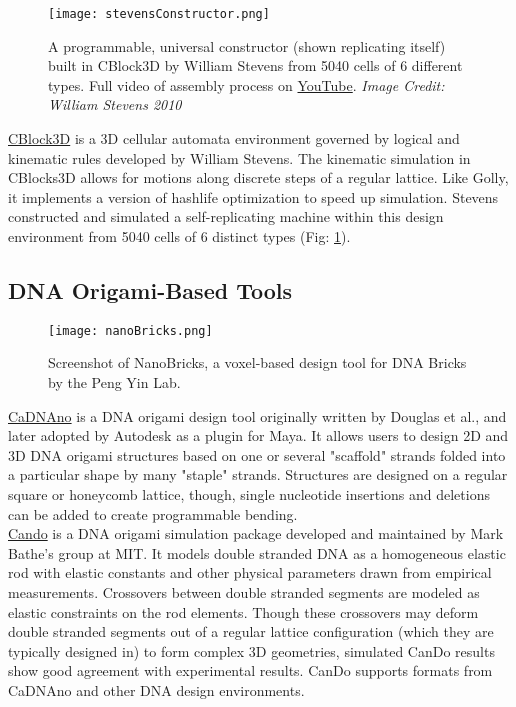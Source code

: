 {\begin{figure}
  \texttt{[image: stevensConstructor.png]}
  \caption{A programmable, universal constructor (shown replicating itself) built in CBlock3D by William Stevens from 5040 cells of 6 different types\cite{Stevens2009b}.  Full video of assembly process on  \href{https://www.youtube.com/watch?v=PBXO_6Jn1fs}{YouTube}. \textit{Image Credit: William Stevens 2010}}
  \label{fig:stevensConstructor}
\end{figure}
\href{https://www.youtube.com/watch?feature=player_embedded&v=PBXO_6Jn1fs}{CBlock3D} is a 3D cellular automata environment governed by logical and kinematic rules developed by William Stevens\cite{Stevens2007}\cite{Stevens2009}.  The kinematic simulation in CBlocks3D allows for motions along discrete steps of a regular lattice.  Like Golly, it implements a version of hashlife optimization\cite{Stevens2010} to speed up simulation.  Stevens constructed and simulated a self-replicating machine within this design environment from 5040 cells of 6 distinct types (Fig: \ref{fig:stevensConstructor})\cite{Stevens2009b}.
\\

\subsection{DNA Origami-Based Tools}

\begin{figure}
  \texttt{[image: nanoBricks.png]}
  \caption{Screenshot of NanoBricks, a voxel-based design tool for DNA Bricks by the Peng Yin Lab.}
  \label{fig:nanoBricks}
\end{figure}

\href{http://cadnano.org/}{CaDNAno} is a DNA origami design tool originally written by Douglas et al.\cite{Douglas2009}, and later adopted by Autodesk as a plugin for Maya.  It allows users to design 2D and 3D DNA origami structures based on one or several "scaffold" strands folded into a particular shape by many "staple" strands.  Structures are designed on a regular square or honeycomb lattice, though, single nucleotide insertions and deletions can be added to create programmable bending\cite{Dietz2009}\cite{Kim2012}.\\

\href{http://cando-dna-origami.org/}{Cando} is a DNA origami simulation package developed and maintained by Mark Bathe's group at MIT.  It models double stranded DNA as a homogeneous elastic rod with elastic constants and other physical parameters drawn from empirical measurements\cite{Peters2014}.  Crossovers between double stranded segments are modeled as elastic constraints on the rod elements.  Though these crossovers may deform double stranded segments out of a regular lattice configuration (which they are typically designed in) to form complex 3D geometries, simulated CanDo results show good agreement with experimental results\cite{Kim2012a}.  CanDo supports formats from CaDNAno and other DNA design environments.
\\

}
